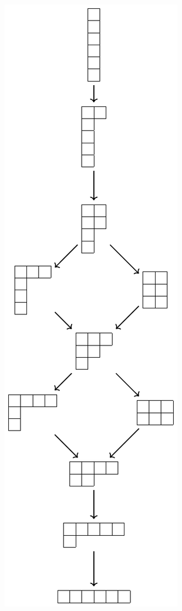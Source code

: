 \documentclass[
    9pt,
    hyperref={bookmarks=false, colorlinks=false}, %
    xcolor={dvipsnames},
]{beamer}
\begin{document}
\begin{frame}
\begin{columns}
\begin{column}{0.25\textwidth}
\begin{center}
                \includegraphics[scale=0.4]{figures/majorization_k_6.pdf}
            \end{center}
        \end{column}
    \end{columns}
\end{frame}
\end{document}
